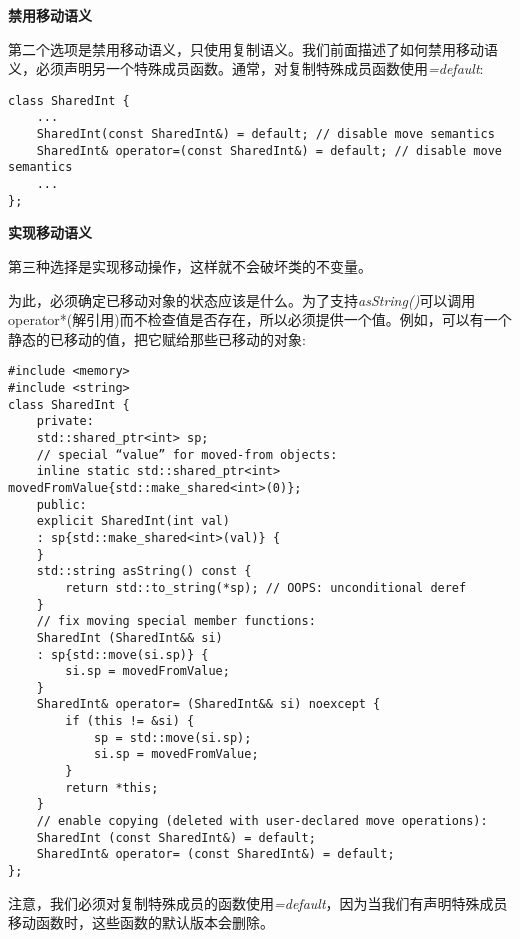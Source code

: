 \hspace*{\fill} \par %
\textbf{禁用移动语义}

第二个选项是禁用移动语义，只使用复制语义。我们前面描述了如何禁用移动语义，必须声明另一个特殊成员函数。通常，对复制特殊成员函数使用\textit{=default}:\par

\begin{lstlisting}[caption={}]
class SharedInt {
	...
	SharedInt(const SharedInt&) = default; // disable move semantics
	SharedInt& operator=(const SharedInt&) = default; // disable move semantics
	...
};
\end{lstlisting}

\hspace*{\fill} \par %
\textbf{实现移动语义}

第三种选择是实现移动操作，这样就不会破坏类的不变量。\par

为此，必须确定已移动对象的状态应该是什么。为了支持\textit{asString()}可以调用operator*(解引用)而不检查值是否存在，所以必须提供一个值。例如，可以有一个静态的已移动的值，把它赋给那些已移动的对象:\par

{\color{red}{basics/sharedint.hpp}}

\begin{lstlisting}[caption={}]
#include <memory>
#include <string>
class SharedInt {
	private:
	std::shared_ptr<int> sp;
	// special “value” for moved-from objects:
	inline static std::shared_ptr<int> movedFromValue{std::make_shared<int>(0)};
	public:
	explicit SharedInt(int val)
	: sp{std::make_shared<int>(val)} {
	}
	std::string asString() const {
		return std::to_string(*sp); // OOPS: unconditional deref
	}
	// fix moving special member functions:
	SharedInt (SharedInt&& si)
	: sp{std::move(si.sp)} {
		si.sp = movedFromValue;
	}
	SharedInt& operator= (SharedInt&& si) noexcept {
		if (this != &si) {
			sp = std::move(si.sp);
			si.sp = movedFromValue;
		}
		return *this;
	}
	// enable copying (deleted with user-declared move operations):
	SharedInt (const SharedInt&) = default;
	SharedInt& operator= (const SharedInt&) = default;
};
\end{lstlisting}

注意，我们必须对复制特殊成员的函数使用\textit{=default}，因为当我们有声明特殊成员移动函数时，这些函数的默认版本会删除。\par


















































